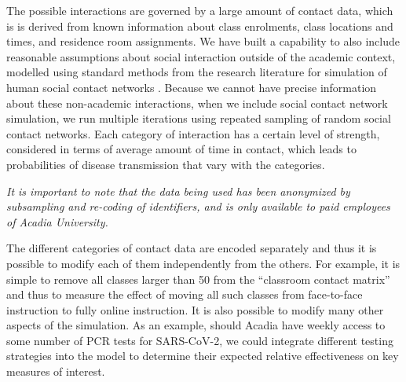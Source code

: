 \documentclass[fleqn,10pt]{SelfArx} %
\begin{document}
The possible interactions are governed by a large amount of contact data, which is 
is derived from known information about class enrolments, class locations and times, and residence room assignments.
We have built a capability to also include reasonable assumptions about social interaction outside of the academic context, modelled using standard methods from the research literature for simulation of human social contact networks \cite{watts_collective_1998,schnettler_structured_2009,amblard_which_2015}. Because we cannot have precise information about these non-academic interactions, when we include social contact network simulation, we run multiple iterations using repeated sampling of random social contact networks.
Each category of interaction has a certain level of strength, considered in terms of average amount of time in contact, which leads to probabilities of disease transmission that vary with the categories.

\emph{It is important to note that the data being used has been anonymized by subsampling and re-coding of identifiers, and is only available to paid employees of Acadia University.}

The different categories of contact data are encoded separately and thus it is possible to modify each of them independently from the others.
For example, it is simple to remove all classes larger than 50 from the ``classroom contact matrix'' and thus to measure the effect of moving all such classes from face-to-face instruction to fully online instruction.
It is also possible to modify many other aspects of the simulation.
As an example, should Acadia have weekly access to some number of PCR tests for SARS-CoV-2, we could  integrate different testing strategies into the model to determine their expected relative effectiveness %
on key measures of interest.  
\end{document}

